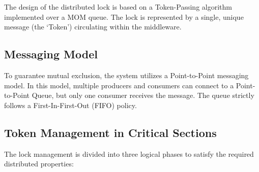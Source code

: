 \documentclass{scrartcl}
\begin{document}
    The design of the distributed lock is based on a Token-Passing algorithm implemented over a MOM queue. The lock is represented by a single, unique message (the `Token') circulating within the middleware.

    \subsection*{Messaging Model}
    To guarantee mutual exclusion, the system utilizes a Point-to-Point messaging model. In this model, multiple producers and consumers can connect to a Point-to-Point Queue, but only one consumer receives the message. The queue strictly follows a First-In-First-Out (FIFO) policy.

    \subsection*{Token Management in Critical Sections}
    The lock management is divided into three logical phases to satisfy the required distributed properties:
\end{document}
